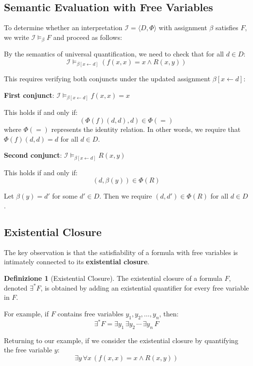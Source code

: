 \documentclass[11pt,a4paper]{article}
\theoremstyle{definition}
\newtheorem{definition}{Definizione}[section]
\theoremstyle{plain}
\theoremstyle{remark}
\begin{document}
\subsection{Semantic Evaluation with Free Variables}

To determine whether an interpretation $\mathcal{I} = \langle D, \Phi \rangle$ with assignment $\beta$ satisfies $F$, we write $\mathcal{I} \models_\beta F$ and proceed as follows:

By the semantics of universal quantification, we need to check that for all $d \in D$:
\[
\mathcal{I} \models_{\beta[x \leftarrow d]} (f(x, x) = x \wedge R(x, y))
\]

This requires verifying both conjuncts under the updated assignment $\beta[x \leftarrow d]$:

\textbf{First conjunct}: $\mathcal{I} \models_{\beta[x \leftarrow d]} f(x, x) = x$

This holds if and only if:
\[
(\Phi(f)(d, d), d) \in \Phi(=)
\]
where $\Phi(=)$ represents the identity relation. In other words, we require that $\Phi(f)(d, d) = d$ for all $d \in D$.

\textbf{Second conjunct}: $\mathcal{I} \models_{\beta[x \leftarrow d]} R(x, y)$

This holds if and only if:
\[
(d, \beta(y)) \in \Phi(R)
\]

Let $\beta(y) = d'$ for some $d' \in D$. Then we require $(d, d') \in \Phi(R)$ for all $d \in D$.

\subsection{Existential Closure}

The key observation is that the satisfiability of a formula with free variables is intimately connected to its \textbf{existential closure}.

\begin{definition}[Existential Closure]
The existential closure of a formula $F$, denoted $\exists^* F$, is obtained by adding an existential quantifier for every free variable in $F$.
\end{definition}

For example, if $F$ contains free variables $y_1, y_2, \dots, y_n$, then:
\[
\exists^* F = \exists y_1 \, \exists y_2 \, \cdots \, \exists y_n \, F
\]

Returning to our example, if we consider the existential closure by quantifying the free variable $y$:
\[
\exists y \, \forall x \, (f(x, x) = x \wedge R(x, y))
\]
\end{document}
